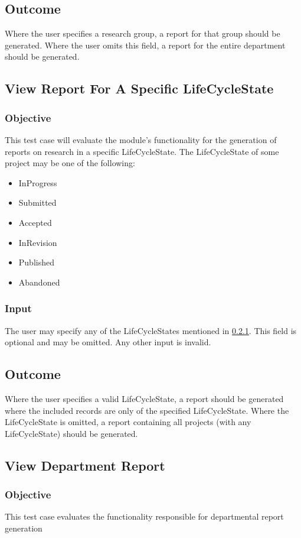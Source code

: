 \subsection{Outcome}
Where the user specifies a research group,  a report for that group should be generated.
Where the user omits this field, a report for the entire department should be generated.

\subsection{View Report For A Specific LifeCycleState}
\subsubsection{Objective} \label{TC_LifeCycleState_Obj}
This test case will evaluate the module's functionality for the generation of reports on research in a specific LifeCycleState. The LifeCycleState of some project may be one of the following:
\begin{itemize}
	\item InProgress
	\item Submitted
	\item Accepted
	\item InRevision
	\item Published
	\item Abandoned
\end{itemize}
\subsubsection{Input}
The user may specify any of the LifeCycleStates mentioned in \ref{TC_LifeCycleState_Obj}.
This field is optional and may be omitted. Any other input is invalid.

\subsection{Outcome}
Where the user specifies a valid LifeCycleState, a report should be generated where the included records are only of the specified LifeCycleState.
Where the LifeCycleState is omitted, a report containing all projects (with any LifeCycleState) should be generated.

\subsection{View Department Report}
\subsubsection{Objective}
This test case evaluates the functionality responsible for departmental report generation

